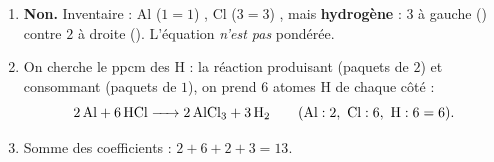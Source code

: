\documentclass[11pt,a4paper]{article}
\begin{document}
\begin{corrige}
\begin{enumerate}[label=\alph*)]
  \item \textbf{Non.} Inventaire : Al ($1=1$) \checkmark, Cl ($3=3$) \checkmark, mais
        \textbf{hydrogène} : $3$ à gauche () contre $2$ à droite (). L'équation
        \emph{n'est pas} pondérée.
  \item On cherche le ppcm des H : la réaction produisant  (paquets de $2$) et consommant
         (paquets de $1$), on prend $6$ atomes H de chaque côté :
        \[
        \ce{2 Al + 6 HCl -> 2 AlCl3 + 3 H2}\qquad(\text{Al}:2,\ \text{Cl}:6,\ \text{H}:6=6).
        \]
  \item Somme des coefficients : $2+6+2+3=\boxed{13}$.
\end{enumerate}
\end{corrige}
\end{document}
